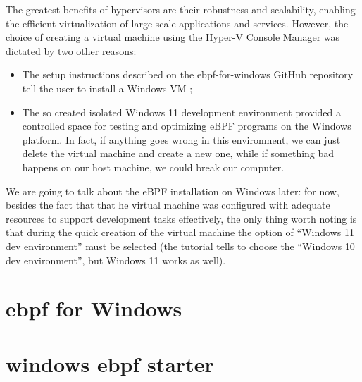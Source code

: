 The greatest benefits of hypervisors are their robustness and scalability, enabling the efficient virtualization of large-scale applications and services.
However, the choice of creating a virtual machine using the Hyper-V Console Manager was dictated by two other reasons:

\begin{itemize}
	\item 
		The setup instructions described on the ebpf-for-windows GitHub repository tell the user to install a Windows VM \cite{VMSetup};
	\item 
		The so created isolated Windows 11 development environment provided a controlled space for testing and optimizing eBPF programs on the Windows platform.
		In fact, if anything goes wrong in this environment, we can just delete the virtual machine and create a new one, while if something bad happens on our host machine, we could break our computer.
\end{itemize}

We are going to talk about the eBPF installation on Windows later: for now, besides the fact that that he virtual machine was configured with adequate resources to support development tasks effectively, the only thing worth noting is that during the quick creation of the virtual machine the option of ``Windows 11 dev environment'' must be selected (the tutorial tells to choose the ``Windows 10 dev environment'', but Windows 11 works as well).  


\section{ebpf for Windows}



\section{windows ebpf starter}

